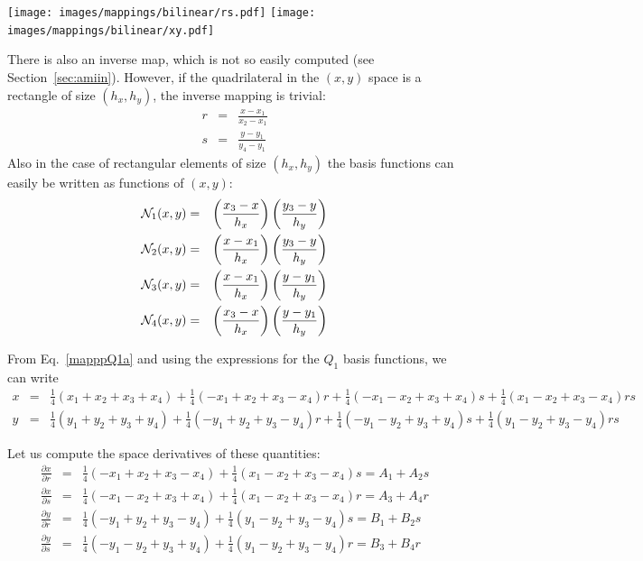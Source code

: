 \begin{center}
\texttt{[image: images/mappings/bilinear/rs.pdf]}
\texttt{[image: images/mappings/bilinear/xy.pdf]}
\end{center}

There is also an inverse map, which is not so easily computed (see Section~\ref{sec:amiin}).
However, if the quadrilateral in the $(x,y)$ space is a rectangle of size $(h_x,h_y)$, 
the inverse mapping is trivial:
\begin{eqnarray}
r&=&\frac{x-x_1}{x_2-x_1} \\
s&=&\frac{y-y_1}{y_4-y_1} 
\end{eqnarray}
Also in the case of rectangular elements of size $(h_x,h_y)$
the basis functions can easily be written as functions of $(x,y)$:
\begin{eqnarray}
{\mathcal{N}}_1(x,y) &=& \left( \frac{x_3 -x }{h_x}  \right) \left( \frac{y_3 -y }{h_y}  \right) \nonumber\\
{\mathcal{N}}_2(x,y) &=& \left( \frac{x - x_1}{h_x}  \right) \left( \frac{y_3 -y }{h_y}  \right) \nonumber\\
{\mathcal{N}}_3(x,y) &=& \left( \frac{x - x_1}{h_x}  \right) \left( \frac{y - y_1}{h_y}  \right) \nonumber\\
{\mathcal{N}}_4(x,y) &=& \left( \frac{x_3 -x }{h_x}  \right) \left( \frac{y - y_1}{h_y}  \right) \nonumber 
\end{eqnarray}

From Eq.~\eqref{mapppQ1a} and using the expressions for the $Q_1$ basis functions, we can write 
\begin{eqnarray}
x &=& 
 \frac14(x_1+ x_2+ x_3 +x_4) 
+\frac14(-x_1 +x_2 +x_3 -x_4) r 
+\frac14(-x_1 -x_2 +x_3 +x_4) s
+\frac14(x_1 -x_2 +x_3 -x_4) rs \nonumber\\
y &=& 
 \frac14(y_1+ y_2+ y_3 +y_4) 
+\frac14(-y_1 +y_2 +y_3 -y_4) r 
+\frac14(-y_1 -y_2 +y_3 +y_4) s
+\frac14(y_1 -y_2 +y_3 -y_4) rs \nonumber
\end{eqnarray}

Let us compute the space derivatives of these quantities:
\begin{eqnarray}
\frac{\partial x}{\partial r} &=& \frac14(-x_1 +x_2 +x_3 -x_4) +\frac14(x_1 -x_2 +x_3 -x_4) s = A_1 + A_2s\nonumber\\
\frac{\partial x}{\partial s} &=& \frac14(-x_1 -x_2 +x_3 +x_4) +\frac14(x_1 -x_2 +x_3 -x_4) r = A_3 + A_4r\nonumber\\
\frac{\partial y}{\partial r} &=& \frac14(-y_1 +y_2 +y_3 -y_4) +\frac14(y_1 -y_2 +y_3 -y_4) s = B_1 + B_2s\nonumber\\
\frac{\partial y}{\partial s} &=& \frac14(-y_1 -y_2 +y_3 +y_4) +\frac14(y_1 -y_2 +y_3 -y_4) r = B_3 + B_4r \nonumber
\end{eqnarray}



